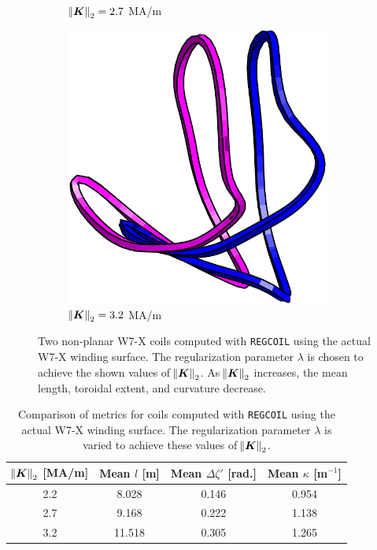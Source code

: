 \documentclass[aps,unsortedaddress]{revtex4-1}
\begin{document}
\begin{figure}
\begin{subfigure}[b]{0.3\textwidth}
\caption{$\norm{\bm{K}}_2 = 2.7$ MA/m}
\end{subfigure}
\begin{subfigure}[b]{0.3\textwidth}
\includegraphics[width=0.95\textwidth]{target_3_2e6.pdf}
\caption{$\norm{\bm{K}}_2 = 3.2$ MA/m}
\end{subfigure}
\caption{Two non-planar W7-X coils computed with \texttt{REGCOIL} using the actual W7-X winding surface. The regularization parameter $\lambda$ is chosen to achieve the shown values of $\norm{\bm{K}}_2$. As $\norm{\bm{K}}_2$ increases, the mean length, toroidal extent, and curvature decrease.}
\label{rmsKcoilcompare}
\end{figure}

\begin{table}
\renewcommand{\arraystretch}{1.4}
\begin{tabular} { | c | c | c | c | }
\hline
$\norm{\bm{K}}_2$ [MA/m] & Mean $l$ [m] & Mean $\Delta \zeta'$ [rad.] & Mean $\kappa$ [m$^{-1}$] \\ \hline 
2.2 & 8.028 & 0.146 & 0.954 \\ \hline
2.7 & 9.168 & 0.222 & 1.138 \\ \hline
3.2 & 11.518 & 0.305 & 1.265 \\ \hline
\end{tabular}
\caption{Comparison of metrics for coils computed with \texttt{REGCOIL} using the actual W7-X winding surface. The regularization parameter $\lambda$ is varied to achieve these values of $\norm{\bm{K}}_2$.}
\label{rmsKcoilmetrics}
\end{table}
\end{document}
